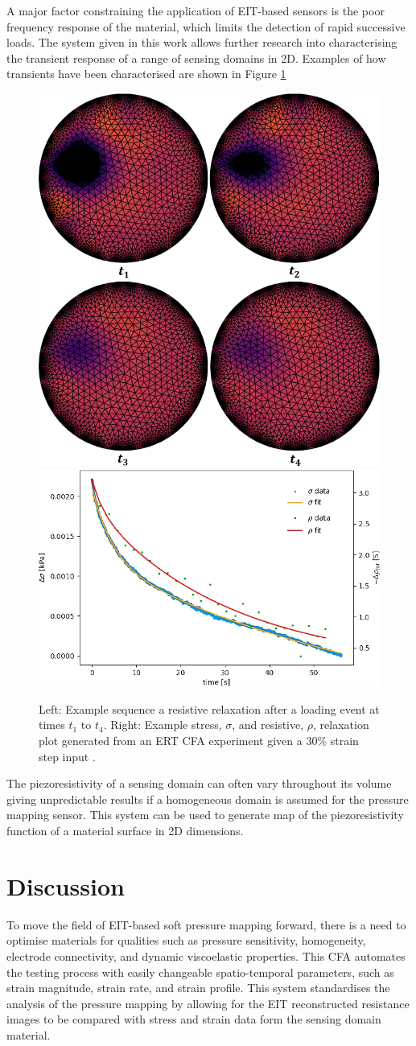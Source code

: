 A major factor constraining the application of EIT-based sensors is the poor frequency response of the material, which limits the detection of rapid successive loads. The system given in this work allows further research into characterising the transient response of a range of sensing domains in 2D. Examples of how transients have been characterised are shown in Figure \ref{fig:2D-transient}
\begin{figure}[H]
\centering
\includegraphics[width=0.35\linewidth]{Figures/res_relax_DEA_EIT_1mm_3load_7kV_1.png}
\hspace{1cm}
\includegraphics[width=0.54\linewidth]{Figures/2D Push event 0 - CBSR 9 wt 30p strain - 2D compressionv2.jpg}
\caption{Left: Example sequence a resistive relaxation after a loading event at times $t_1$ to $t_4$. Right: Example stress, $\sigma$, and resistive, $\rho$, relaxation plot generated from an ERT CFA experiment given a 30\% strain step input \cite{Ellingham2024}.}
\label{fig:2D-transient}
\end{figure}

The piezoresistivity of a sensing domain can often vary throughout its volume giving unpredictable results if a homogeneous domain is assumed for the pressure mapping sensor. This system can be used to generate map of the piezoresistivity function of a material surface in 2D dimensions.

\section{Discussion}
To move the field of EIT-based soft pressure mapping forward, there is a need to optimise materials for qualities such as pressure sensitivity, homogeneity, electrode connectivity, and dynamic viscoelastic properties.
This CFA automates the testing process with easily changeable spatio-temporal parameters, such as strain magnitude, strain rate, and strain profile. This system standardises the analysis of the pressure mapping by allowing for the EIT reconstructed resistance images to be compared with stress and strain data form the sensing domain material.

